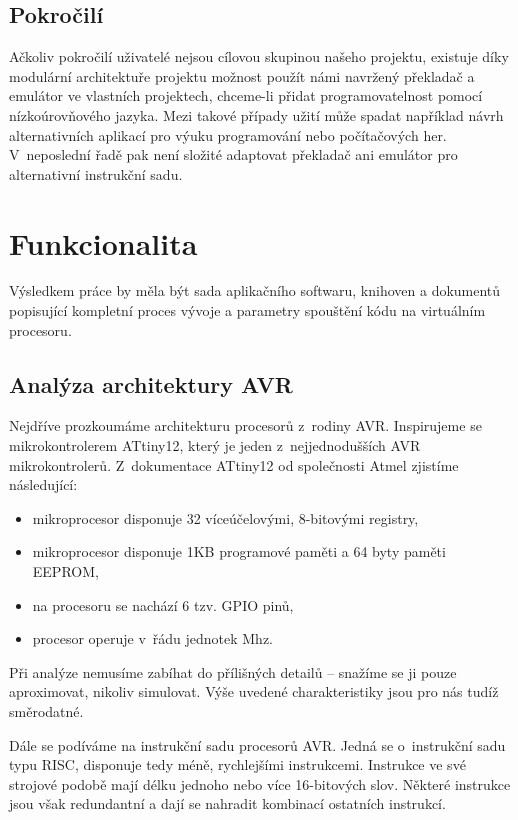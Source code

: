 \subsection{Pokročilí}

Ačkoliv pokročilí uživatelé nejsou cílovou skupinou našeho projektu, existuje díky modulární architektuře projektu možnost použít námi navržený překladač a emulátor ve vlastních projektech, chceme-li přidat programovatelnost pomocí nízkoúrovňového jazyka. Mezi takové případy užití může spadat například návrh alternativních aplikací pro výuku programování nebo počítačových her. V~neposlední řadě pak není složité adaptovat překladač ani emulátor pro alternativní instrukční sadu.

\section{Funkcionalita}

Výsledkem práce by měla být sada aplikačního softwaru, knihoven a dokumentů popisující kompletní proces vývoje a parametry spouštění kódu na virtuálním procesoru.

\subsection{Analýza architektury AVR}
\label{sec:spec-avr}

Nejdříve prozkoumáme architekturu procesorů z~rodiny AVR. Inspirujeme se mikrokontrolerem ATtiny12, který je jeden z~nejjednodušších AVR mikrokontrolerů. Z~dokumentace ATtiny12 od společnosti Atmel\cite{attiny12-datasheet} zjistíme následující:

\begin{itemize}
	\item mikroprocesor disponuje 32 víceúčelovými, 8-bitovými registry,
	\item mikroprocesor disponuje 1KB programové paměti a 64 byty paměti EEPROM,
	\item na procesoru se nachází 6 tzv. GPIO pinů,
	\item procesor operuje v~řádu jednotek Mhz.
\end{itemize}

Při analýze nemusíme zabíhat do přílišných detailů -- snažíme se ji pouze aproximovat, nikoliv simulovat. Výše uvedené charakteristiky jsou pro nás tudíž směrodatné.

Dále se podíváme na instrukční sadu procesorů AVR. Jedná se o~instrukční sadu typu RISC, disponuje tedy méně, rychlejšími instrukcemi. Instrukce ve své strojové podobě mají délku jednoho nebo více 16-bitových slov. Některé instrukce jsou však redundantní a dají se nahradit kombinací ostatních instrukcí.

